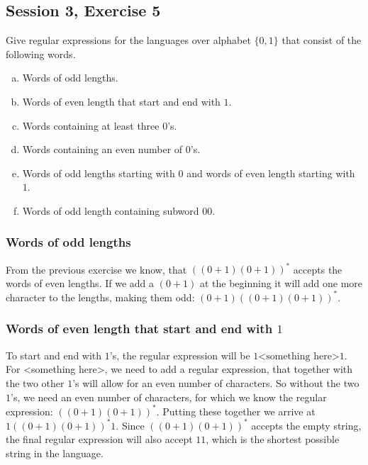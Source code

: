 \subsection{Session 3, Exercise 5}


Give regular expressions for the languages over alphabet $\{0,1\}$ that consist of the following words.

\begin{enumerate}[(a)]
\item Words of odd lengths.
\item Words of even length that start and end with $1$.
\item Words containing at least three $0$'s.
\item Words containing an even number of $0$'s.
\item Words of odd lengths starting with $0$ and words of even length starting with $1$.
\item Words of odd length containing subword $00$.
\end{enumerate}


\subsubsection{Words of odd lengths}

From the previous exercise we know, that $((0+1)(0+1))^*$ accepts the words of even lengths. If we add a $(0+1)$ at the beginning it will add one more character to the lengths, making them odd: $(0+1)((0+1)(0+1))^*$.

\subsubsection{Words of even length that start and end with $1$}

To start and end with $1$'s, the regular expression will be $1\text{<something here>}1$. For <something here>, we need to add a regular expression, that together with the two other $1$'s will allow for an even number of characters. So without the two $1$'s, we need an even number of characters, for which we know the regular expression: $((0+1)(0+1))^*$. Putting these together we arrive at $1((0+1)(0+1))^*1$. Since $((0+1)(0+1))^*$ accepts the empty string, the final regular expression will also accept $11$, which is the shortest possible string in the language.

